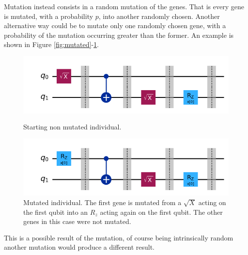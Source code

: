 \documentclass[12pt]{article}
\begin{document}
Mutation instead consists in a random mutation of the genes. That is every gene is mutated, with a probability $p$, into another randomly chosen. Another alternative way could be to mutate only one randomly chosen gene, with a probability of the mutation occurring greater than the former. An example is shown in Figure \ref{fig:mutated}-\ref{fig:nonmutated}.  
\begin{figure}[h!]
    \centering
    \begin{minipage}{0.7\textwidth}
        \centering
        \includegraphics[width=\linewidth]{images/mutated.png}
        \caption{Starting non mutated individual.}
        \label{fig:mutated}
    \end{minipage}
    \hfill
    \begin{minipage}{0.7\textwidth}
        \centering
        \includegraphics[width=\linewidth]{images/nonmutated.png}
        \caption{Mutated individual. The first gene is mutated from a $\sqrt{X}$ acting on the first qubit into an $R_z$ acting again on the first qubit. The other genes in this case were not mutated.}
        \label{fig:nonmutated}
    \end{minipage}
\end{figure}
This is a possible result of the mutation, of course being intrinsically random another mutation would produce a different result.  
\end{document}
